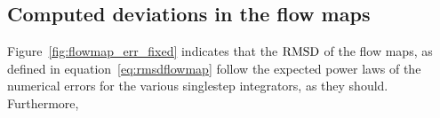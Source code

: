 \subsection{Computed deviations in the flow maps}
\label{sub:computed_deviations_in_the_flow_maps}





Figure~\ref{fig:flowmap_err_fixed} indicates that the $\operatorname{RMSD}$ of the flow maps,
as defined in equation~\eqref{eq:rmsdflowmap} follow the expected power laws
of the numerical errors for the various singlestep integrators, as they should.
Furthermore,
